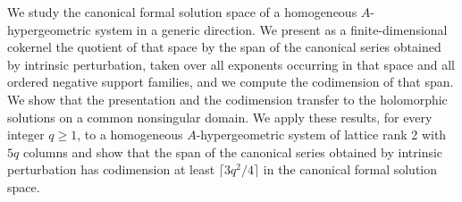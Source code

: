 	We study the canonical formal solution space of a homogeneous \(A\)-hypergeometric system in a generic direction.
	We present as a finite-dimensional cokernel the quotient of that space by the span of the canonical series obtained by intrinsic perturbation, taken over all exponents occurring in that space and all ordered negative support families, and we compute the codimension of that span.
	We show that the presentation and the codimension transfer to the holomorphic solutions on a common nonsingular domain.
	We apply these results, for every integer \(q\geq1\), to a homogeneous \(A\)-hypergeometric system of lattice rank 2 with \(5q\) columns and show that the span of the canonical series obtained by intrinsic perturbation has codimension at least \(\lceil3q^2/4\rceil\) in the canonical formal solution space.
